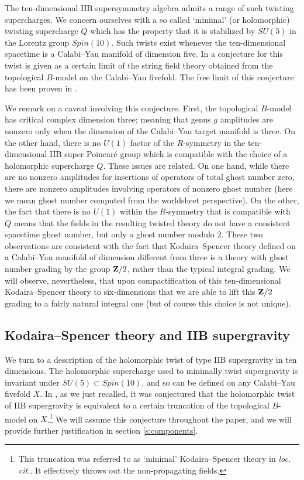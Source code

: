 \documentclass[../main.tex]{subfiles}
\begin{document}
The ten-dimensional IIB supersymmetry algebra admits a range of such twisting supercharges.
We concern ourselves with a so called `minimal' (or holomorphic) twisting supercharge $Q$ which has the property that it is stabilized by $SU(5)$ in the Lorentz group $Spin(10)$.
Such twists exist whenever the ten-dimensional spacetime is a Calabi--Yau manifold of dimension five.
In \cite{CLsugra} a conjecture for this twist is given as a certain limit of the string field theory obtained from the topological $B$-model on the Calabi--Yau fivefold.
The free limit of this conjecture has been proven in \cite{SWspinor}.

We remark on a caveat involving this conjecture.
First, the topological $B$-model has critical complex dimension three; meaning that genus $g$ amplitudes are nonzero only when the dimension of the Calabi--Yau target manifold is three.
On the other hand, there is no $U(1)$ factor of the $R$-symmetry in the ten-dimensional IIB super Poincar\'e group which is compatible with the choice of a holomorphic supercharge $Q$.
These issues are related.
On one hand, while there are no nonzero amplitudes for insertions of operators of total ghost number zero, there are nonzero amplitudes involving operators of nonzero ghost number (here we mean ghost number computed from the worldsheet perspective).
On the other, the fact that there is no $U(1)$ within the $R$-symmetry that is compatible with $Q$ means that the fields in the resulting twisted theory do not have a consistent spacetime ghost number, but only a ghost number modulo $2$.
These two observations are consistent with the fact that Kodaira--Spencer theory defined on a Calabi--Yau manifold of dimension different from three is a theory with ghost number grading by the group $\mathbf Z/2$, rather than the typical integral grading.
We will observe, nevertheless, that upon compactification of this ten-dimensional Kodaira--Spencer theory to six-dimensions that we are able to lift this $\mathbf Z/2$ grading to a fairly natural integral one (but of course this choice is not unique).


\subsection{Kodaira--Spencer theory and IIB supergravity}

We turn to a description of the holomorphic twist of type IIB supergravity in ten dimensions.
The holomorphic supercharge used to minimally twist supergravity is invariant under $SU(5) \subset Spin(10)$, and so can be defined on any Calabi--Yau fivefold $X$.
In \cite{CLsugra}, as we just recalled, it was conjectured that the holomorphic twist of IIB supergravity is equivalent to a certain truncation of the topological $B$-model on $X$.\footnote{This truncation was referred to as `minimal' Kodaira--Spencer theory in \textit{loc. cit.}. 
It effectively throws out the non-propagating fields.}
We will assume this conjecture throughout the paper, and we will provide further justification in section \ref{s:components}.
\end{document}
